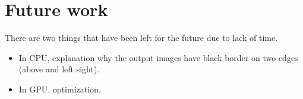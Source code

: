 \documentclass[12pt]{article}
\begin{document}
\section{Future work}
There are two things that have been left for the future due to lack of time.
\begin{itemize}
    \item In CPU, explanation why the output images have black border on two edges (above and left sight).
    \item In GPU, optimization.
\end{itemize}
\end{document}
